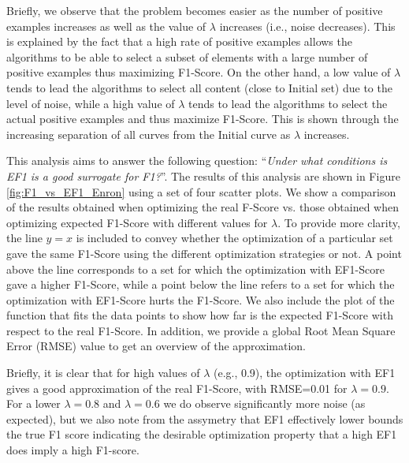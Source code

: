 
Briefly, we observe that the problem becomes easier as the number of positive examples increases as well as the value of $\lambda$ increases (i.e., noise decreases). 
This is explained by the fact that a high rate of positive examples allows the algorithms to be able to select a subset of elements with a large number of positive examples thus maximizing F1-Score. On the other hand, a low value of $\lambda$ tends to lead the algorithms to select all content (close to Initial set) due to the level of noise, while a high value of $\lambda$ tends to lead the algorithms to select the actual positive examples and thus maximize F1-Score. This is shown through the increasing separation of all curves from the Initial curve as $\lambda$ increases.









 This analysis aims to answer the following question: \textquotedblleft \textit{Under what conditions is EF1 is a good surrogate for F1?}\textquotedblright{}. The results of this analysis are shown in Figure \ref{fig:F1_vs_EF1_Enron} using a set of four scatter plots.
We show a comparison of the results obtained when optimizing the real F-Score vs. those obtained when optimizing expected F1-Score with different values for $\lambda$.
To provide more clarity, the line $y = x$ is included to convey whether the optimization of a particular set gave the same F1-Score using the different optimization strategies or not. A point above the line corresponds to a set for which the optimization with EF1-Score gave a higher F1-Score, while a point below the line refers to a set for which the optimization with EF1-Score  hurts the F1-Score. We also include the plot of the function that fits the data points to show how far is the expected F1-Score with respect to the real F1-Score. In addition, we provide a global Root Mean Square Error (RMSE) value to get an overview of the approximation.

Briefly, it is clear that for high values of $\lambda$ (e.g., 0.9), the optimization with EF1 gives a good approximation of the real F1-Score, with RMSE=0.01 for $\lambda=0.9$. For a lower $\lambda=0.8$ and $\lambda=0.6$ we do observe significantly more noise (as expected), but we also note from the assymetry that EF1 effectively lower bounds the true F1 score indicating the desirable optimization property that a high EF1 does imply a high F1-score.


